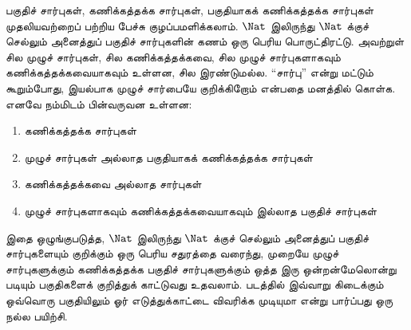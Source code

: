 \documentclass[../../../include/open-logic-section]{subfiles}
\begin{document}
பகுதிச் சார்புகள், கணிக்கத்தக்க சார்புகள், பகுதியாகக் கணிக்கத்தக்க
சார்புகள் முதலியவற்றைப் பற்றிய பேச்சு குழப்பமளிக்கலாம்.
$\Nat$ இலிருந்து $\Nat$ க்குச் செல்லும் அனைத்துப் பகுதிச்
சார்புகளின் கணம் ஒரு பெரிய பொருட்திரட்டு. அவற்றுள் சில முழுச்
சார்புகள், சில கணிக்கத்தக்கவை, சில முழுச் சார்புகளாகவும்
கணிக்கத்தக்கவையாகவும் உள்ளன, சில இரண்டுமல்ல. “சார்பு” என்று
மட்டும் கூறும்போது, இயல்பாக முழுச் சார்பையே குறிக்கிறோம் என்பதை
மனத்தில் கொள்க. எனவே நம்மிடம் பின்வருவன உள்ளன:
\begin{enumerate}
\item கணிக்கத்தக்க சார்புகள்
\item முழுச் சார்புகள் அல்லாத பகுதியாகக் கணிக்கத்தக்க சார்புகள்
\item கணிக்கத்தக்கவை அல்லாத சார்புகள்
\item முழுச் சார்புகளாகவும் கணிக்கத்தக்கவையாகவும் இல்லாத பகுதிச்
சார்புகள்
\end{enumerate}
இதை ஒழுங்குபடுத்த, $\Nat$ இலிருந்து $\Nat$ க்குச் செல்லும் அனைத்துப்
பகுதிச் சார்புகளையும் குறிக்கும் ஒரு பெரிய சதுரத்தை வரைந்து,
முறையே முழுச் சார்புகளுக்கும் கணிக்கத்தக்க பகுதிச் சார்புகளுக்கும்
ஒத்த இரு ஒன்றன்மேலொன்று படியும் பகுதிகளைக் குறித்துக் காட்டுவது
உதவலாம். படத்தில் இவ்வாறு கிடைக்கும் ஒவ்வொரு பகுதியிலும் ஓர்
எடுத்துக்காட்டை விவரிக்க முடியுமா என்று பார்ப்பது ஒரு நல்ல பயிற்சி.
\end{document}
